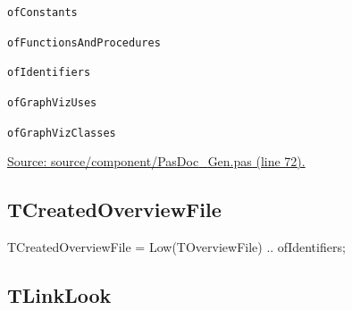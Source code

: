 \documentclass{report}
\newif\ifpdf
\begin{document}
\begin{list}{}
\begin{description}
\item[\texttt{ofConstants}] \label{PasDoc_Gen-ofConstants}
\index{}
 
\item[\texttt{ofFunctionsAndProcedures}] \label{PasDoc_Gen-ofFunctionsAndProcedures}
\index{}
 
\item[\texttt{ofIdentifiers}] \label{PasDoc_Gen-ofIdentifiers}
\index{}
 
\item[\texttt{ofGraphVizUses}] \label{PasDoc_Gen-ofGraphVizUses}
\index{}
 
\item[\texttt{ofGraphVizClasses}] \label{PasDoc_Gen-ofGraphVizClasses}
\index{}
 
\end{description}
\par
\href{https://github.com/pasdoc/pasdoc/blob/master/source/component/PasDoc_Gen.pas#L72}{Source: source/component/PasDoc{\_}Gen.pas (line 72).}

\end{list}
\ifpdf
\subsection*{\large{\textbf{TCreatedOverviewFile}}\normalsize\hspace{1ex}\hrulefill}
\else
\subsection*{TCreatedOverviewFile}
\fi
\label{PasDoc_Gen-TCreatedOverviewFile}
\begin{list}{}{
\setlength{\itemindent}{0cm}
\setlength{\listparindent}{0cm}
\setlength{\leftmargin}{\evensidemargin}
\addtolength{\leftmargin}{\tmplength}
\settowidth{\labelsep}{X}
\addtolength{\leftmargin}{\labelsep}
\setlength{\labelwidth}{\tmplength}
}
\item[\textbf{Declaration}\hfill]
\ifpdf
\begin{flushleft}
\fi
\begin{ttfamily}
TCreatedOverviewFile = Low(TOverviewFile) .. ofIdentifiers;\end{ttfamily}

\ifpdf
\end{flushleft}
\fi

\end{list}
\ifpdf
\subsection*{\large{\textbf{TLinkLook}}\normalsize\hspace{1ex}\hrulefill}
\else
\end{document}
